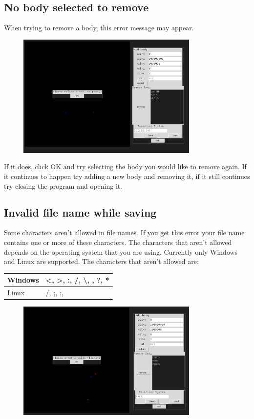\documentclass[a4paper,11pt,titlepage]{article}
\begin{document}
\subsection{No body selected to remove}
When trying to remove a body, this error message may appear.
\begin{figure}[H]
	\centering
	\includegraphics[width=0.8\textwidth]{../img/rm3.png}
\end{figure}

If it does, click OK and try selecting the body you would like to remove again.
If it continues to happen try adding a new body and removing it, if it still
continues try closing the program and opening it.

\subsection{Invalid file name while saving}
Some characters aren't allowed in file names. If you get this error your file
name contains one or more of these characters. The characters that aren't
allowed depends on the operating system that you are using. Currently only
Windows and Linux are supported. The characters that aren't allowed are: \\

\begin{tabular}{l|l}
	Windows & \textless, \textgreater, :, /, \textbackslash{}, \textbar, ?,
	* \\ \hline
	Linux & /, ;, :, \textbar
\end{tabular}
\begin{figure}[H]
	\centering
	\includegraphics[width=0.8\textwidth]{../img/save.png}
\end{figure}
\end{document}
